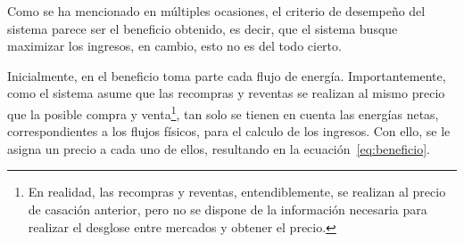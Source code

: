 Como se ha mencionado en múltiples ocasiones, el criterio de desempeño del sistema parece ser el beneficio obtenido, es decir, que el sistema busque maximizar los ingresos, en cambio, esto no es del todo cierto.

Inicialmente, en el beneficio toma parte cada flujo de energía. Importantemente, como el sistema asume que las recompras y reventas se realizan al mismo precio que la posible compra y venta\footnote{En realidad, las recompras y reventas, entendiblemente, se realizan al precio de casación anterior, pero no se dispone de la información necesaria para realizar el desglose entre mercados y obtener el precio.}, tan solo se tienen en cuenta las energías netas, correspondientes a los flujos físicos, para el calculo de los ingresos. Con ello, se le asigna un precio a cada uno de ellos, resultando en la ecuación~\ref{eq:beneficio}.

